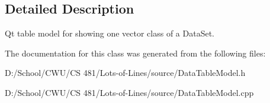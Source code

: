 \subsection{Detailed Description}
Qt table model for showing one vector class of a Data\+Set. 

The documentation for this class was generated from the following files\+:\begin{DoxyCompactItemize}
\item 
D\+:/\+School/\+C\+W\+U/\+C\+S 481/\+Lots-\/of-\/\+Lines/source/Data\+Table\+Model.\+h\item 
D\+:/\+School/\+C\+W\+U/\+C\+S 481/\+Lots-\/of-\/\+Lines/source/Data\+Table\+Model.\+cpp\end{DoxyCompactItemize}
